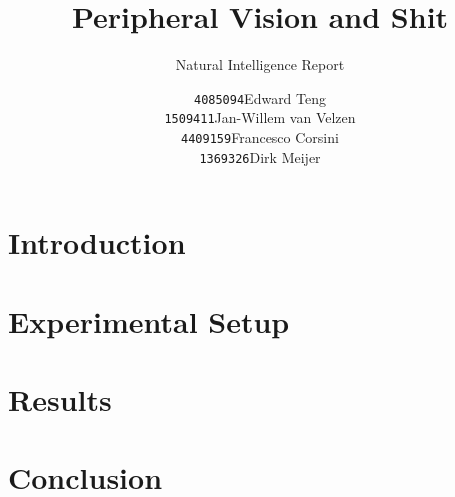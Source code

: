 \documentclass[a4,11pt]{scrreprt}
\title{Peripheral Vision and Shit}
\subtitle{Natural Intelligence Report}
\author{
\begin{tabular}{ll}
\texttt{4085094}&Edward Teng\\
\texttt{1509411}&Jan-Willem van Velzen\\
\texttt{4409159}&Francesco Corsini\\
\texttt{1369326}&Dirk Meijer
\end{tabular}}
\begin{document}
    \maketitle{}
    \tableofcontents
    \chapter{Introduction}
    
    \chapter{Experimental Setup}
    
    \chapter{Results}
    
    \chapter{Conclusion}
    
    
    
     
    \nocite {*} 
    
    
\end{document}
